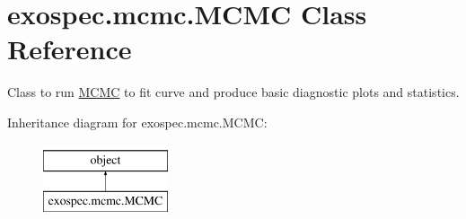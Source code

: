 \hypertarget{classexospec_1_1mcmc_1_1_m_c_m_c}{}\section{exospec.\+mcmc.\+M\+C\+MC Class Reference}
\label{classexospec_1_1mcmc_1_1_m_c_m_c}


Class to run \hyperlink{classexospec_1_1mcmc_1_1_m_c_m_c}{M\+C\+MC} to fit curve and produce basic diagnostic plots and statistics.  


Inheritance diagram for exospec.\+mcmc.\+M\+C\+MC\+:\begin{figure}[H]
\begin{center}
\leavevmode
\includegraphics[height=2.000000cm]{classexospec_1_1mcmc_1_1_m_c_m_c}
\end{center}
\end{figure}
